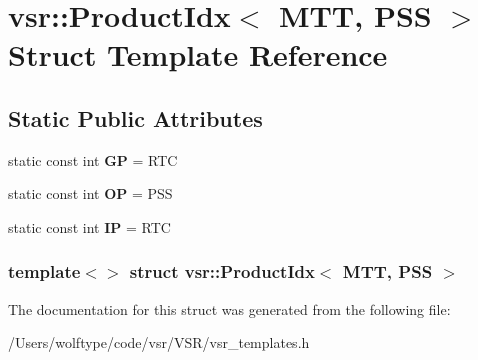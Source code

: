 \hypertarget{structvsr_1_1_product_idx_3_01_m_t_t_00_01_p_s_s_01_4}{\section{vsr\-:\-:Product\-Idx$<$ M\-T\-T, P\-S\-S $>$ Struct Template Reference}
\label{structvsr_1_1_product_idx_3_01_m_t_t_00_01_p_s_s_01_4}
}
\subsection*{Static Public Attributes}
\begin{DoxyCompactItemize}
\item 
\hypertarget{structvsr_1_1_product_idx_3_01_m_t_t_00_01_p_s_s_01_4_a1657954041db7491a68bcd27949ee261}{static const int {\bfseries G\-P} = R\-T\-C}\label{structvsr_1_1_product_idx_3_01_m_t_t_00_01_p_s_s_01_4_a1657954041db7491a68bcd27949ee261}

\item 
\hypertarget{structvsr_1_1_product_idx_3_01_m_t_t_00_01_p_s_s_01_4_af2ab955790784ca5d072300713b6edd6}{static const int {\bfseries O\-P} = P\-S\-S}\label{structvsr_1_1_product_idx_3_01_m_t_t_00_01_p_s_s_01_4_af2ab955790784ca5d072300713b6edd6}

\item 
\hypertarget{structvsr_1_1_product_idx_3_01_m_t_t_00_01_p_s_s_01_4_a5d1df2003ef8a06f24f6179f74441a64}{static const int {\bfseries I\-P} = R\-T\-C}\label{structvsr_1_1_product_idx_3_01_m_t_t_00_01_p_s_s_01_4_a5d1df2003ef8a06f24f6179f74441a64}

\end{DoxyCompactItemize}
\subsubsection*{template$<$$>$ struct vsr\-::\-Product\-Idx$<$ M\-T\-T, P\-S\-S $>$}



The documentation for this struct was generated from the following file\-:\begin{DoxyCompactItemize}
\item 
/\-Users/wolftype/code/vsr/\-V\-S\-R/vsr\-\_\-templates.\-h\end{DoxyCompactItemize}
